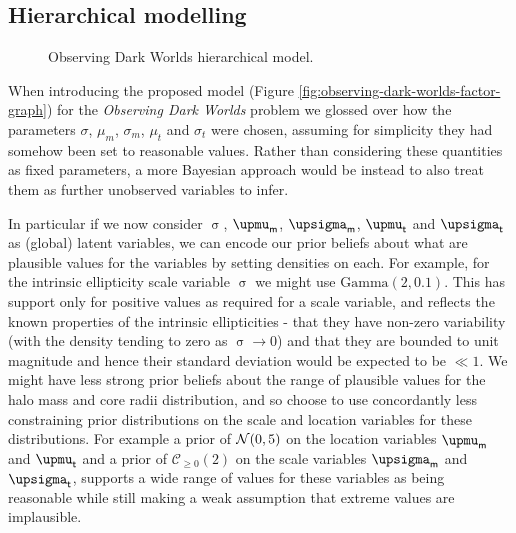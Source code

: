 


\subsection{Hierarchical modelling}

\begin{figure}
\centering
{}
\caption[Observing Dark Worlds hierarchical model.]{Observing Dark Worlds hierarchical model.} %
\label{fig:odw-hierarchical-factor-graph}
\end{figure}

When introducing the proposed model (Figure \ref{fig:observing-dark-worlds-factor-graph}) for the \emph{Observing Dark Worlds} problem we glossed over how the parameters $\sigma$, $\mu_m$, $\sigma_m$, $\mu_t$ and $\sigma_t$ were chosen, assuming for simplicity they had somehow been set to reasonable values. Rather than considering these quantities as fixed parameters, a more Bayesian approach would be instead to also treat them as further unobserved variables to infer.

In particular if we now consider $\upsigma$, $\upmu_{\rvar{m}}$, $\upsigma_{\rvar{m}}$, $\upmu_{\rvar{t}}$ and $\upsigma_{\rvar{t}}$ as (global) latent variables, we can encode our prior beliefs about what are plausible values for the variables by setting densities on each. For example, for the intrinsic ellipticity scale variable $\upsigma$ we might use $\mathrm{Gamma}(2,0.1)$. This has support only for positive values as required for a scale variable, and reflects the known properties of the intrinsic ellipticities - that they have non-zero variability (with the density tending to zero as $\upsigma \to 0$) and that they are bounded to unit magnitude and hence their standard deviation would be expected to be $ \ll 1$. We might have less strong prior beliefs about the range of plausible values for the halo mass and core radii distribution, and so choose to use concordantly less constraining prior distributions on the scale and location variables for these distributions. For example a prior of $\nrm{0, 5}$ on the location variables $\upmu_{\rvar{m}}$ and $\upmu_{\rvar{t}}$ and a prior of $\mathcal{C}_{\geq 0}(2)$ on the scale variables $\upsigma_{\rvar{m}}$ and $\upsigma_{\rvar{t}}$, supports a wide range of values for these variables as being reasonable while still making a weak assumption that extreme values are implausible.

